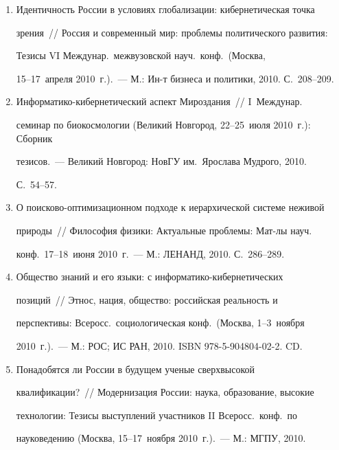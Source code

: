 \begin{enumerate}[1.]
С.~44--47.


\item {}


Идентичность России в условиях глобализации: кибернетическая точка 


зрения~/\!\!/  Россия и современный мир: проблемы политического развития: 


Тезисы VI Междунар.\ межвузовской науч.\ конф.\ (Москва, 


15--17~апреля 2010~г.).~--- М.: Ин-т бизнеса и политики, 2010. С.~208--209.


\item {}


Информатико-кибернетический аспект Мироздания~/\!\!/  I~Междунар.\ 


семинар по биокосмологии (Великий Новгород, 22--25~июля 2010~г.): Сборник 


тезисов.~--- Великий Новгород: НовГУ им.\ Ярослава Мудрого, 2010. 


С.~54--57.


\item {}


О поисково-оптимизационном подходе к иерархической сис\-теме неживой 


природы~/\!\!/  Философия физики: Актуальные проблемы: Мат-лы науч.\ 


конф.\ 17--18~июня 2010~г.~--- М.: ЛЕНАНД, 2010. С.~286--289.


\item {}


Общество знаний и его языки: с информатико-ки\-бер\-не\-ти\-че\-ских 


позиций~/\!\!/  Этнос, нация, общество: российская реальность и 


перспективы: Всеросс.\ социологическая конф.\ (Москва, 1--3~ноября 


2010~г.).~--- М.: РОС; ИС РАН, 2010. ISBN 978-5-904804-02-2. CD.


\item {}


Понадобятся ли России в будущем ученые сверхвысокой 


квалификации?~/\!\!/  Модернизация России: наука, образование, высокие 


технологии: Тезисы выступлений участников II Всеросс.\  конф.\ по 


науковедению (Москва, 15--17~ноября 2010~г.).~--- М.: МГПУ, 2010. 



\end{enumerate}
